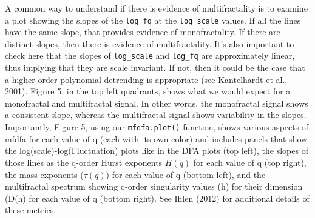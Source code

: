 \documentclass[
  man]{apa6}
\begin{document}
A common way to understand if there is evidence of multifractality is to
examine a plot showing the slopes of the \texttt{log\_fq} at the \texttt{log\_scale}
values. If all the lines have the same slope, that provides evidence of
monofractality. If there are distinct slopes, then there is evidence of
multifractality. It's also important to check here that the slopes of
\texttt{log\_scale} and \texttt{log\_fq} are approximately linear, thus implying that
they are scale invariant. If not, then it could be the case that a
higher order polynomial detrending is appropriate (see Kantelhardt et
al., 2001). Figure 5, in the top left quadrants, shows what we would
expect for a monofractal and multifractal signal. In other words, the
monofractal signal shows a consistent slope, whereas the multifractal
signal shows variability in the slopes. Importantly, Figure 5, using our
\texttt{mfdfa.plot()} function, shows various aspects of mfdfa for each value
of q (each with its own color) and includes panels that show the
log(scale)-log(Fluctuation) plots like in the DFA plots (top left), the
slopes of those lines as the q-order Hurst exponents \(H(q)\) for each
value of q (top right), the mass exponents (\(\tau(q)\)) for each value of
q (bottom left), and the multifractal spectrum showing q-order
singularity values (h) for their dimension (D(h) for each value of q
(bottom right). See Ihlen (2012) for additional details of these
metrics.
\end{document}
